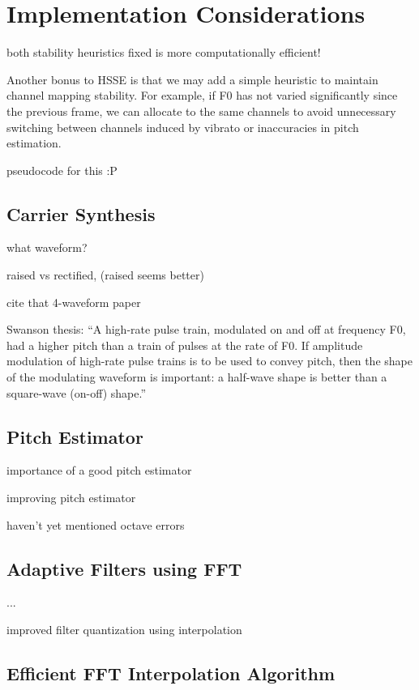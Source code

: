 \documentclass [11pt, proquest,oneside] {ganter_thesis}[2015/03/03]
\begin{document}
\section{Implementation Considerations}

both stability heuristics
fixed is more computationally efficient!

Another bonus to HSSE is that we may add a simple heuristic to maintain channel mapping stability.  For example, if F0 has not varied significantly since the previous frame, we can allocate to the same channels to avoid unnecessary switching between channels induced by vibrato or inaccuracies in pitch estimation.

pseudocode for this :P

\subsection{Carrier Synthesis}

what waveform?

raised vs rectified, (raised seems better)

cite that 4-waveform paper

Swanson thesis: ``A high-rate pulse train, modulated on and off at frequency F0, had a higher pitch than a train of pulses at the rate of F0. If amplitude modulation of high-rate pulse trains is to be used to convey pitch, then the shape of the modulating waveform is important: a half-wave shape is better than a square-wave (on-off) shape.''

\subsection{Pitch Estimator}

importance of a good pitch estimator

improving pitch estimator

haven't yet mentioned octave errors

\subsection{Adaptive Filters using FFT}

...

improved filter quantization using interpolation

\subsection{Efficient FFT Interpolation Algorithm}
\end{document}
